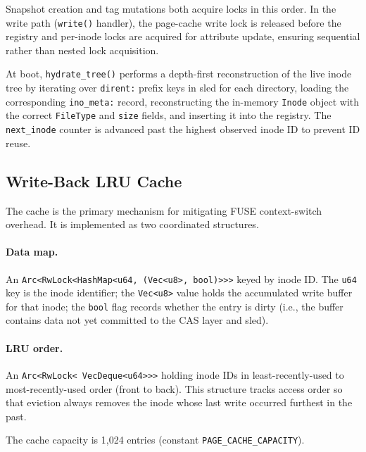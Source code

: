 \documentclass[journal]{IEEEtran}
\begin{document}
Snapshot creation and tag mutations both acquire locks in this order.
In the write path (\texttt{write()} handler), the page-cache write lock
is released before the registry and per-inode locks are acquired for
attribute update, ensuring sequential rather than nested lock acquisition.

At boot, \texttt{hydrate\_tree()} performs a depth-first reconstruction
of the live inode tree by iterating over \texttt{dirent:} prefix keys
in sled for each directory, loading the corresponding \texttt{ino\_meta:}
record, reconstructing the in-memory \texttt{Inode} object with the
correct \texttt{FileType} and \texttt{size} fields, and inserting it into
the registry.  The \texttt{next\_inode} counter is advanced past the
highest observed inode ID to prevent ID reuse.

\subsection{Write-Back LRU Cache}
\label{sec:cache}

The cache is the primary mechanism for mitigating FUSE context-switch
overhead.  It is implemented as two coordinated structures.

\paragraph{Data map.}
An \texttt{Arc\textless{}RwLock\textless{}HashMap\textless{}u64,\allowbreak
(Vec\textless{}u8\textgreater{},\,bool)\textgreater{}\textgreater{}\textgreater{}}
keyed by inode ID.  The \texttt{u64} key is the inode identifier;
the \texttt{Vec\textless{}u8\textgreater{}} value holds the accumulated
write buffer for that inode; the \texttt{bool} flag records whether the
entry is dirty (i.e., the buffer contains data not yet committed to the
CAS layer and sled).

\paragraph{LRU order.}
An \texttt{Arc\textless{}\allowbreak{}RwLock\textless{}\allowbreak{}%
VecDeque\textless{}u64\textgreater{}\textgreater{}\textgreater{}}
holding inode IDs in least-recently-used to most-recently-used order
(front to back). This structure tracks access order so that eviction
always removes the inode whose last write occurred furthest in the past.

The cache capacity is 1,024 entries (constant \texttt{PAGE\_CACHE\_CAPACITY}).
\end{document}
